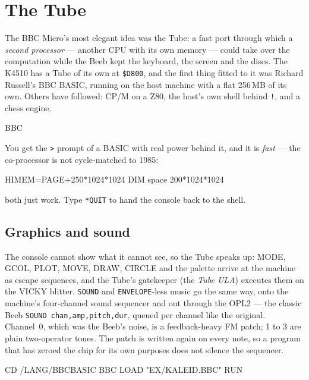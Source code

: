 \chapter{The Tube}\label{cha:tube}

The BBC Micro's most elegant idea was the Tube: a fast port through which a
\emph{second processor} --- another CPU with its own memory --- could take
over the computation while the Beeb kept the keyboard, the screen and the
discs. The K4510 has a Tube of its own at \texttt{\$D800}, and the first
thing fitted to it was Richard Russell's BBC BASIC, running on the host
machine with a flat 256\,MB of its own. Others have followed: CP/M on a
Z80, the host's own shell
behind \verb|!|, and a chess
engine.

\begin{type}
BBC
\end{type}

You get the \verb|>| prompt of a BASIC with real power behind it, and it
is \emph{fast} --- the co-processor is not cycle-matched to 1985:

\begin{type}
HIMEM=PAGE+250*1024*1024
DIM space 200*1024*1024
\end{type}

both just work. Type \verb|*QUIT| to hand the console back to the shell.

\section{Graphics and sound}
The console cannot show what it cannot see, so the Tube speaks up: MODE,
GCOL, PLOT, MOVE, DRAW, CIRCLE and the palette arrive at the machine as
escape sequences, and the Tube's gatekeeper (the \emph{Tube ULA}) executes
them on the VICKY blitter. \verb|SOUND| and \verb|ENVELOPE|-less music go
the same way, onto the machine's four-channel sound sequencer and out
through the OPL2 --- the classic Beeb \texttt{SOUND chan,amp,pitch,dur},
queued per channel like the original. Channel~0, which was the Beeb's
noise, is a feedback-heavy FM patch; 1 to 3 are plain two-operator tones.
The patch is written again on every note, so a program that has zeroed
the chip for its own purposes does not silence the sequencer.

\begin{type}
CD /LANG/BBCBASIC
BBC
LOAD "EX/KALEID.BBC"
RUN
\end{type}

